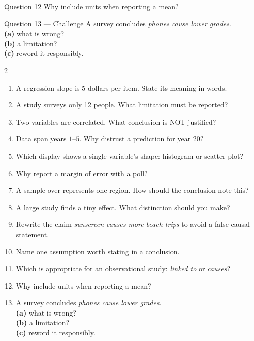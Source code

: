 \documentclass[11pt]{article}
\begin{document}
\begin{qbox}{Question 12}
Why include units when reporting a mean?\workspace{2.4cm}
\end{qbox}

\begin{qbox}{Question 13 --- Challenge}
A survey concludes \emph{phones cause lower grades}. \\ \textbf{(a)} what is wrong? \\ \textbf{(b)} a limitation? \\ \textbf{(c)} reword it responsibly.\workspace{3cm}
\end{qbox}

\clearpage
{}

\begin{recapbox}
\begin{multicols}{2}
\small
\begin{enumerate}[leftmargin=*,itemsep=3pt]
  \item A regression slope is $5$ dollars per item. State its meaning in words.
  \item A study surveys only 12 people. What limitation must be reported?
  \item Two variables are correlated. What conclusion is NOT justified?
  \item Data span years $1$--$5$. Why distrust a prediction for year $20$?
  \item Which display shows a single variable's shape: histogram or scatter plot?
  \item Why report a margin of error with a poll?
  \item A sample over-represents one region. How should the conclusion note this?
  \item A large study finds a tiny effect. What distinction should you make?
  \item Rewrite the claim \emph{sunscreen causes more beach trips} to avoid a false causal statement.
  \item Name one assumption worth stating in a conclusion.
  \item Which is appropriate for an observational study: \emph{linked to} or \emph{causes}?
  \item Why include units when reporting a mean?
  \item A survey concludes \emph{phones cause lower grades}. \\ \textbf{(a)} what is wrong? \\ \textbf{(b)} a limitation? \\ \textbf{(c)} reword it responsibly.
\end{enumerate}
\end{multicols}
\end{recapbox}
\end{document}
